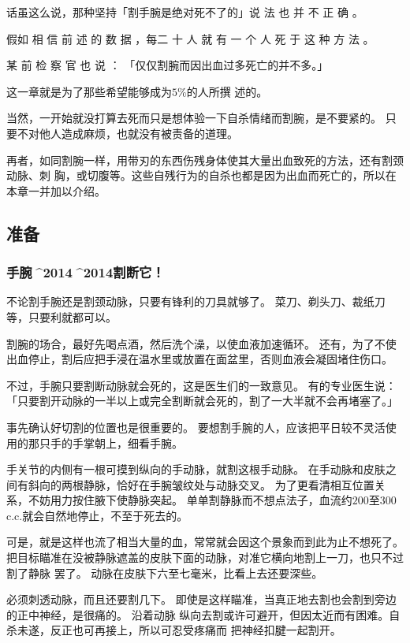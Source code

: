 \documentclass[UTF8]{ctexart}
\begin{document}
话虽这么说，那种坚持「割手腕是绝对死不了的」说 法 也 并 不 正 确 。

假如 相 信 前 述 的 数 据 ，每二 十 人 就 有 一 个 人 死 于 这 种 方 法 。

某 前 检 察 官 也 说 ： 「仅仅割腕而因出血过多死亡的并不多。」

这一章就是为了那些希望能够成为$5\%$的人所撰 述的。

当然，一开始就没打算去死而只是想体验一下自杀情绪而割腕，是不要紧的。
只要不对他人造成麻烦，也就没有被责备的道理。

再者，如同割腕一样，用带刃的东西伤残身体使其大量出血致死的方法，还有割颈动脉、刺
胸，或切腹等。这些自残行为的自杀也都是因为出血而死亡的，所以在本章一并加以介绍。

\subsection{准备}

\subsubsection{手腕^^^^2014^^^^2014割断它！}

不论割手腕还是割颈动脉，只要有锋利的刀具就够了。
菜刀、剃头刀、裁纸刀等，只要利就都可以。

割腕的场合，最好先喝点酒，然后洗个澡，以使血液加速循环。
还有，为了不使出血停止，割后应把手浸在温水里或放置在面盆里，否则血液会凝固堵住伤口。

不过，手腕只要割断动脉就会死的，这是医生们的一致意见。
有的专业医生说：「只要割开动脉的一半以上或完全割断就会死的，割了一大半就不会再堵塞了。」

事先确认好切割的位置也是很重要的。
要想割手腕的人，应该把平日较不灵活使用的那只手的手掌朝上，细看手腕。

手关节的内侧有一根可摸到纵向的手动脉，就割这根手动脉。
在手动脉和皮肤之间有斜向的两根静脉，恰好在手腕皱纹处与动脉交叉。
为了更看清相互位置关系，不妨用力按住腋下使静脉突起。
单单割静脉而不想点法子，血流约$200$至$300$c.c.就会自然地停止，不至于死去的。

可是，就是这样也流了相当大量的血，常常就会因这个景象而到此为止不想死了。
把目标瞄准在没被静脉遮盖的皮肤下面的动脉，对准它横向地割上一刀，也只不过割了静脉 罢了。
动脉在皮肤下六至七毫米，比看上去还要深些。

必须刺透动脉，而且还要割几下。
即使是这样瞄准，当真正地去割也会割到旁边的正中神经，是很痛的。
沿着动脉 纵向去割或许可避开，但因太近而有困难。自杀未遂，反正也可再接上，所以可忍受疼痛而 把神经扣腱一起割开。
\end{document}
